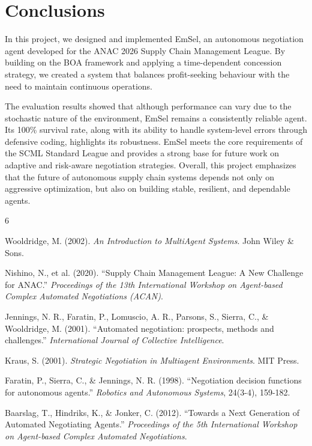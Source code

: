 \documentclass[a4paper,11pt]{article}
\begin{document}
	\section*{Conclusions} 
	
	In this project, we designed and implemented EmSel, an autonomous negotiation agent developed for the ANAC 2026 Supply Chain Management League. By building on the BOA framework and applying a time-dependent concession strategy, we created a system that balances profit-seeking behaviour with the need to maintain continuous operations.
	
	The evaluation results showed that although performance can vary due to the stochastic nature of the environment, EmSel remains a consistently reliable agent. Its 100\% survival rate, along with its ability to handle system-level errors through defensive coding, highlights its robustness. EmSel meets the core requirements of the SCML Standard League and provides a strong base for future work on adaptive and risk-aware negotiation strategies. Overall, this project emphasizes that the future of autonomous supply chain systems depends not only on aggressive optimization, but also on building stable, resilient, and dependable agents.
	
	\begin{thebibliography}{6}
		
		Wooldridge, M. (2002). \emph{An Introduction to MultiAgent Systems}. John Wiley \& Sons.
		
		Nishino, N., et al. (2020). ``Supply Chain Management League: A New Challenge for ANAC.'' \emph{Proceedings of the 13th International Workshop on Agent-based Complex Automated Negotiations (ACAN)}.
		
		Jennings, N. R., Faratin, P., Lomuscio, A. R., Parsons, S., Sierra, C., \& Wooldridge, M. (2001). ``Automated negotiation: prospects, methods and challenges.'' \emph{International Journal of Collective Intelligence}.
		
		Kraus, S. (2001). \emph{Strategic Negotiation in Multiagent Environments}. MIT Press.
		
		Faratin, P., Sierra, C., \& Jennings, N. R. (1998). ``Negotiation decision functions for autonomous agents.'' \emph{Robotics and Autonomous Systems}, 24(3-4), 159-182.
		
		Baarslag, T., Hindriks, K., \& Jonker, C. (2012). ``Towards a Next Generation of Automated Negotiating Agents.'' \emph{Proceedings of the 5th International Workshop on Agent-based Complex Automated Negotiations}.
		
	\end{thebibliography}
	
\end{document}
